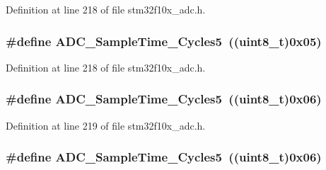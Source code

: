 Definition at line 218 of file stm32f10x\+\_\+adc.\+h.

\subsubsection[{\texorpdfstring{A\+D\+C\+\_\+\+Sample\+Time\+\_\+55\+Cycles5}{ADC_SampleTime_55Cycles5}}]{\setlength{\rightskip}{0pt plus 5cm}\#define A\+D\+C\+\_\+\+Sample\+Time\+\_\+Cycles5~(({\bf uint8\+\_\+t})0x05)}\hypertarget{group___a_d_c__sampling__time_ga6a6fbbadc0e35a719fb749bf6b0704d6}{}\label{group___a_d_c__sampling__time_ga6a6fbbadc0e35a719fb749bf6b0704d6}


Definition at line 218 of file stm32f10x\+\_\+adc.\+h.

\subsubsection[{\texorpdfstring{A\+D\+C\+\_\+\+Sample\+Time\+\_\+71\+Cycles5}{ADC_SampleTime_71Cycles5}}]{\setlength{\rightskip}{0pt plus 5cm}\#define A\+D\+C\+\_\+\+Sample\+Time\+\_\+Cycles5~(({\bf uint8\+\_\+t})0x06)}\hypertarget{group___a_d_c__sampling__time_gae46e8978ac3160969156739ddb867dae}{}\label{group___a_d_c__sampling__time_gae46e8978ac3160969156739ddb867dae}


Definition at line 219 of file stm32f10x\+\_\+adc.\+h.

\subsubsection[{\texorpdfstring{A\+D\+C\+\_\+\+Sample\+Time\+\_\+71\+Cycles5}{ADC_SampleTime_71Cycles5}}]{\setlength{\rightskip}{0pt plus 5cm}\#define A\+D\+C\+\_\+\+Sample\+Time\+\_\+Cycles5~(({\bf uint8\+\_\+t})0x06)}\hypertarget{group___a_d_c__sampling__time_gae46e8978ac3160969156739ddb867dae}{}\label{group___a_d_c__sampling__time_gae46e8978ac3160969156739ddb867dae}



